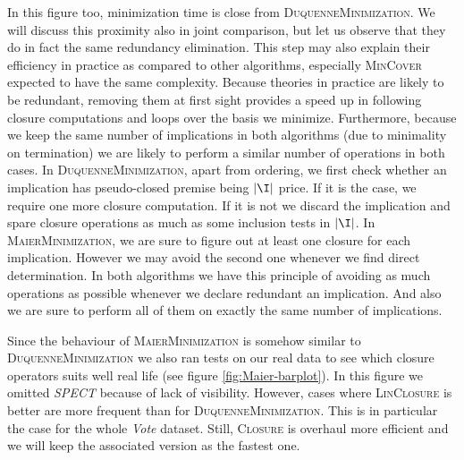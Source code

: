 \begin{figure}[H]
	
\end{figure}

\begin{figure}[H]
	
\end{figure} 

\vspace{1.2em} 

In this figure too, minimization time is close from \textsc{DuquenneMinimization}. We will discuss this proximity also in joint comparison, but let us observe that they do in fact the same redundancy elimination. This step may also explain their efficiency in practice as compared to other algorithms, especially \textsc{MinCover} expected to have 
the same complexity. Because theories in practice are likely to be redundant,
removing them at first sight provides a speed up in following closure computations and loops over the basis we minimize. Furthermore, because we keep the same number of implications in both algorithms (due to minimality on termination) we are likely to perform a similar number of operations in both cases. In \textsc{DuquenneMinimization}, apart from ordering, we first check whether an implication has pseudo-closed premise being $|\I|$ price. If it is the case, we require one more closure computation. If it is not we discard the implication and spare closure operations as much as some inclusion tests in $|\I|$. In \textsc{MaierMinimization}, we are sure to figure out at least one closure for each implication. However we may avoid the second one whenever we find direct determination. In both algorithms we have this principle of avoiding as much operations as possible whenever we declare redundant an implication. And also we are sure to perform all of them on exactly the same number of implications.

\vspace{1.2em}

\noindent Since the behaviour of \textsc{MaierMinimization} is somehow similar to \textsc{DuquenneMinimization} we also ran tests on our real data to see which
closure operators suits well real life (see figure \ref{fig:Maier-barplot}). In
this figure we omitted \textit{SPECT} because of lack of visibility. However, cases where \textsc{LinClosure} is better are more frequent than for \textsc{DuquenneMinimization}. This is in particular the case for the whole \textit{Vote} dataset. Still, \textsc{Closure} is overhaul more efficient and 
we will keep the associated version as the fastest one.


